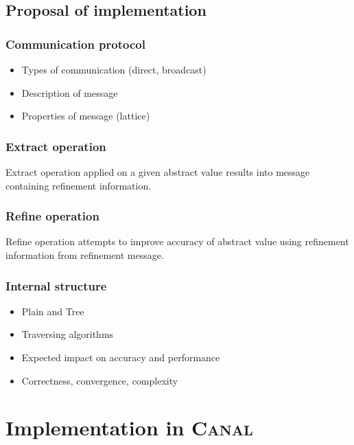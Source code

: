 \documentclass[12pt,oneside]{fithesis2}
\theoremstyle{definition}
\begin{document}
\section{Proposal of implementation}\label{sec:proposal-of-implementation}

\subsection{Communication protocol}
\begin{itemize}
  \item Types of communication (direct, broadcast)
  \item Description of message
  \item Properties of message (lattice)
\end{itemize}

\subsection{Extract operation}

Extract operation applied on a given abstract value results into message containing refinement information.

\subsection{Refine operation}

Refine operation attempts to improve accuracy of abstract value using refinement information from refinement message.

\subsection{Internal structure}
\begin{itemize}
  \item Plain and Tree
  \item Traversing algorithms
  \item Expected impact on accuracy and performance
  \item Correctness, convergence, complexity
\end{itemize}


\chapter{Implementation in \textsc{Canal}}
\end{document}
